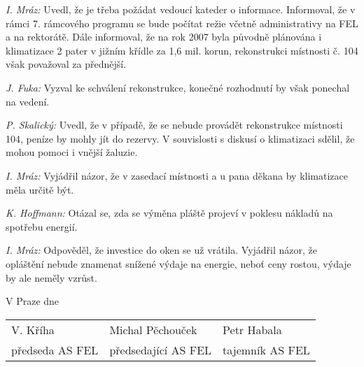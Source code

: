 \documentclass[a4paper,12pt,notitlepage,oneside]{article}
\begin{document}
\textit{I. Mráz:} Uvedl, že je třeba požádat vedoucí kateder o informace. Informoval, že v rámci 7. rámcového programu se bude počítat režie včetně administrativy na FEL a na rektorátě. Dále informoval, že na rok 2007 byla původně plánována i klimatizace 2 pater v jižním křídle za 1,6 mil. korun, rekonstrukci místnosti č. 104 však považoval za přednější.

\textit{J. Fuka:} Vyzval ke schválení rekonstrukce, konečné rozhodnutí by však ponechal na vedení.

\textit{P. Skalický:} Uvedl, že v případě, že se nebude provádět rekonstrukce místnosti 104, peníze by mohly jít do rezervy. V souvislosti s diskusí o klimatizaci sdělil, že mohou pomoci i vnější žaluzie.

\textit{I. Mráz:} Vyjádřil názor, že v zasedací místnosti a u pana děkana by klimatizace měla určitě být.

\textit{K. Hoffmann:} Otázal se, zda se výměna pláště projeví v poklesu nákladů na spotřebu energií.

\textit{I. Mráz:} Odpověděl, že investice do oken se už vrátila. Vyjádřil názor, že opláštění nebude znamenat snížené výdaje na energie, neboť ceny rostou, výdaje by ale neměly vzrůst.


\bigskip\bigskip\bigskip\bigskip\bigskip\bigskip


V Praze dne


\bigskip\bigskip\bigskip

\begin{center}
\begin{tabular}{p{4cm}p{4cm}p{4cm}}
V. Kříha & Michal Pěchouček & Petr Habala \\
předseda AS FEL & předsedající AS FEL & tajemník AS FEL
\end{tabular}
\end{center}
\end{document}
